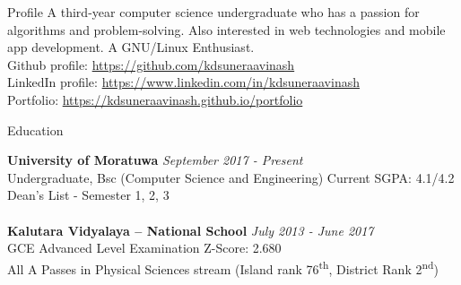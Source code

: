 \documentclass{cv}
\subtitle{344/1, Moonamalgahawatta, Duwa Temple Road, Kalutara South.}  %
\subtitle{(076) 833 6850 \\ \href{mailto:suneraavinash.17@cse.mrt.ac.lk}{suneraavinash.17@cse.mrt.ac.lk}}
\begin{document}
\begin{adjustwidth}{55pt}{0pt}
\vspace{5pt}


\begin{rSection}{Profile}
A third-year computer science undergraduate who has a passion for algorithms and problem-solving.  
Also interested in web technologies and mobile app development. A GNU/Linux Enthusiast.\\
    Github profile: \url{https://github.com/kdsuneraavinash} \\
    LinkedIn profile: \url{https://www.linkedin.com/in/kdsuneraavinash} \\
    Portfolio: \url{https://kdsuneraavinash.github.io/portfolio} 
\end{rSection}

\begin{rSection}{Education}

{\bf University of Moratuwa}                                \hfill {\em September 2017 - Present} 
\\ Undergraduate, Bsc (Computer Science and Engineering)    \hfill { Current SGPA: 4.1/4.2 }
\\ Dean's List - Semester 1, 2, 3 \\
\\{\bf Kalutara Vidyalaya – National School}                \hfill {\em July 2013 - June 2017} 
\\ GCE Advanced Level Examination                           \hfill { Z-Score: 2.680 }
\\ All A Passes in Physical Sciences stream (Island rank 76\textsuperscript{th}, District Rank 2\textsuperscript{nd}) 
\end{rSection}



\end{adjustwidth}
\end{document}
